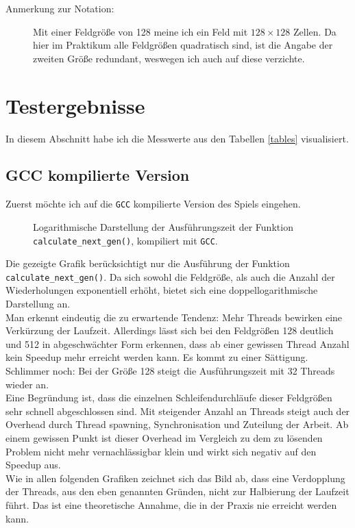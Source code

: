 \documentclass[german,plainarticle,hyperref,utf8]{zihpub}
\begin{document}
	\begin{description}
		\item[Anmerkung zur Notation:] Mit einer Feldgröße von 128 meine ich ein Feld mit $128\times 128$ Zellen. Da hier im Praktikum alle Feldgrößen quadratisch sind, ist die Angabe der zweiten Größe redundant, weswegen ich auch auf diese verzichte.
	\end{description}

	\newpage
	\section{Testergebnisse} \label{erg}
	In diesem Abschnitt habe ich die Messwerte aus den Tabellen \ref{tables} visualisiert.
	\subsection{GCC kompilierte Version}
	Zuerst möchte ich auf die \texttt{GCC} kompilierte Version des Spiels eingehen.\\
	
	\begin{figure}[h]
		\begin{center}
			
		\end{center}
		\caption{Logarithmische Darstellung der Ausführungszeit der Funktion \texttt{calculate\_next\_gen()}, kompiliert mit \texttt{GCC}.}
	\end{figure}
	Die gezeigte Grafik berücksichtigt nur die Ausführung der Funktion \texttt{calculate\_next\_gen()}. Da sich sowohl die Feldgröße, als auch die Anzahl der Wiederholungen exponentiell erhöht, bietet sich eine doppellogarithmische Darstellung an.\\
	Man erkennt eindeutig die zu erwartende Tendenz: Mehr Threads bewirken eine Verkürzung der Laufzeit. Allerdings lässt sich bei den Feldgrößen 128 deutlich und 512 in abgeschwächter Form erkennen, dass ab einer gewissen Thread Anzahl kein Speedup mehr erreicht werden kann. Es kommt zu einer Sättigung. Schlimmer noch: Bei der Größe 128 steigt die Ausführungszeit mit 32 Threads wieder an.\\
	Eine Begründung ist, dass die einzelnen Schleifendurchläufe dieser Feldgrößen sehr schnell abgeschlossen sind. Mit steigender Anzahl an Threads steigt auch der Overhead durch Thread spawning, Synchronisation und Zuteilung der Arbeit. Ab einem gewissen Punkt ist dieser Overhead im Vergleich zu dem zu lösenden Problem nicht mehr vernachlässigbar klein und wirkt sich negativ auf den Speedup aus.\\
	Wie in allen folgenden Grafiken zeichnet sich das Bild ab, dass eine Verdopplung der Threads, aus den eben genannten Gründen, nicht zur Halbierung der Laufzeit führt. Das ist eine theoretische Annahme, die in der Praxis nie erreicht werden kann.\\
	
\end{document}
